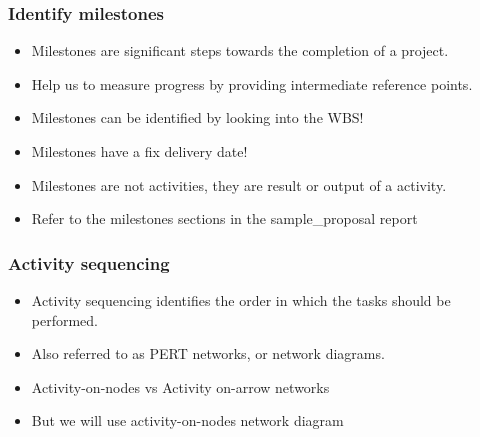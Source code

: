 \documentclass{beamer}
\begin{document}



\begin{frame}[t]\frametitle{Identify milestones}
    \begin{itemize}
        \item Milestones are significant steps towards the completion of a project.
        \item Help us to measure progress by providing intermediate reference points.
        \item Milestones can be identified by looking into the WBS!
        \item Milestones have a fix delivery date!
        \item Milestones are not activities, they are result or output of a activity.
        \item Refer to the milestones sections in the sample\_proposal report
    \end{itemize}
\end{frame}

\begin{frame}[t]\frametitle{Activity sequencing}
\begin{itemize}
        \item Activity sequencing identifies the order in which the tasks should be performed.
        \item Also referred to as PERT networks, or network diagrams.
        \item Activity-on-nodes vs Activity on-arrow networks
        \item But we will use activity-on-nodes network diagram
    \end{itemize}
\end{frame}
\end{document}
